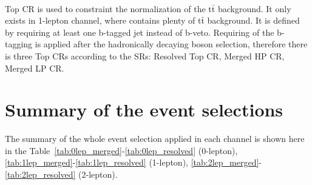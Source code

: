 

\noindent\textbf{}  \\
Top CR is used to constraint the normalization of the t$\bar{\mathrm{t}}$ background. It only exists in 1-lepton channel, where contains plenty of t$\bar{\mathrm{t}}$ background. 
It is defined by requiring at least one b-tagged jet instead of b-veto. Requiring of the b-tagging is applied after the hadronically decaying boson selection, therefore there is three Top CRs according to the SRs: Resolved Top CR, Merged HP CR, Merged LP CR.

\section{Summary of the event selections}
\label{sec:sumES}
The summary of the whole event selection applied in each channel is shown here in the Table~\ref{tab:0lep_merged}-\ref{tab:0lep_resolved} (0-lepton), \ref{tab:1lep_merged}-\ref{tab:1lep_resolved} (1-lepton), \ref{tab:2lep_merged}-\ref{tab:2lep_resolved} (2-lepton).

